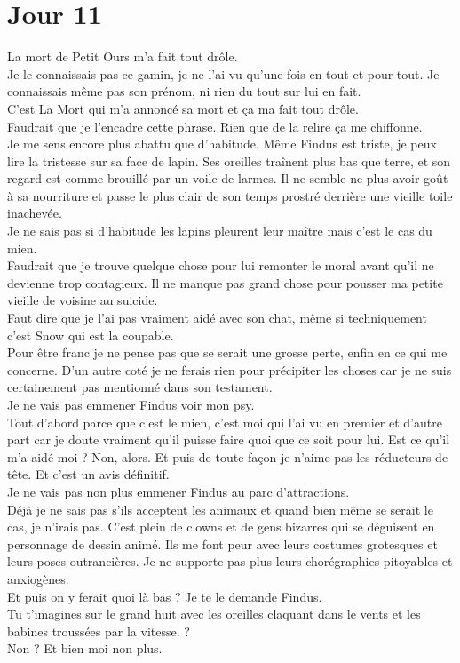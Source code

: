 \chapter*{Jour 11}
La mort de Petit Ours m'a fait tout drôle. \\
Je le connaissais pas ce gamin, je ne l'ai vu qu'une fois en tout et pour tout. Je connaissais même pas son prénom, ni rien du tout sur lui en fait. \\
C'est La Mort qui m'a annoncé sa mort et ça ma fait tout drôle. \\

Faudrait que je l'encadre cette phrase. Rien que de la relire ça me chiffonne. \\

Je me sens encore plus abattu que d'habitude. Même Findus est triste, je peux lire la tristesse sur sa face de lapin. Ses oreilles traînent plus bas que terre, et son regard est comme brouillé par un voile de larmes. Il ne semble ne plus avoir goût à sa nourriture et passe le plus clair de son temps prostré derrière une vieille toile inachevée. \\
Je ne sais pas si d'habitude les lapins pleurent leur maître mais c'est le cas du mien. \\

Faudrait que je trouve quelque chose pour lui remonter le moral avant qu'il ne devienne trop contagieux. Il ne manque pas grand chose pour pousser ma petite vieille de voisine au suicide. \\
Faut dire que je l'ai pas vraiment aidé avec son chat, même si techniquement c'est Snow qui est la coupable. \\
Pour être franc je ne pense pas que se serait une grosse perte, enfin en ce qui me concerne. D'un autre coté je ne ferais rien pour précipiter les choses car je ne suis certainement pas mentionné dans son testament. \\

Je ne vais pas emmener Findus voir mon psy. \\
Tout d'abord parce que c'est le mien, c'est moi qui l'ai vu en premier et d'autre part car je doute vraiment qu'il puisse faire quoi que ce soit pour lui. Est ce qu'il m'a aidé moi ? Non, alors. Et puis de toute façon je n'aime pas les réducteurs de tête. Et c'est un avis définitif. \\

Je ne vais pas non plus emmener Findus au parc d'attractions. \\
Déjà je ne sais pas s'ils acceptent les animaux et quand bien même se serait le cas, je n'irais pas. C'est plein de clowns et de gens bizarres qui se déguisent en personnage de dessin animé. Ils me font peur avec leurs costumes grotesques et leurs poses outrancières. Je ne supporte pas plus leurs chorégraphies pitoyables et anxiogènes. \\
Et puis on y ferait quoi là bas ? Je te le demande Findus. \\
Tu t'imagines sur le grand huit avec les oreilles claquant dans le vents et les babines troussées par la vitesse. ? \\
Non ? Et bien moi non plus. \\

